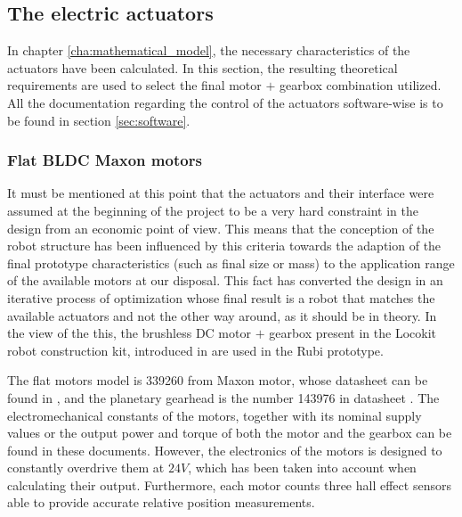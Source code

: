 
\subsection{The electric actuators} %
\label{sub:electric_actuators}
In chapter \ref{cha:mathematical_model}, the necessary characteristics of the actuators have been calculated.
In this section, the resulting theoretical requirements are used to select the final motor $+$ gearbox combination utilized.
All the documentation regarding the control of the actuators software-wise is to be found in section \ref{sec:software}.

\subsubsection{Flat BLDC Maxon motors} %
\label{ssub:the_bldc_motors}
It must be mentioned at this point that the actuators and their interface were assumed at the beginning of the project to be a very hard constraint in the design from an economic point of view. 
This means that the conception of the robot structure has been influenced by this criteria towards the adaption of the final prototype characteristics (such as final size or mass) to the application range of the available motors at our disposal.
This fact has converted the design in an iterative process of optimization whose final result is a robot that matches the available actuators and not the other way around, as it should be in theory.
In the view of the this, the brushless DC motor $+$ gearbox present in the Locokit robot construction kit, introduced in \cite{locokit} are used in the Rubi prototype.

The flat motors model is 339260 from Maxon motor, whose datasheet can be found in \cite{maxon_motor}, and the planetary gearhead is the number 143976 in datasheet \cite{maxon_gear}.
The electromechanical constants of the motors, together with its nominal supply values or the output power and torque of both the motor and the gearbox can be found in these documents. 
However, the electronics of the motors is designed to constantly overdrive them at $24V$, which has been taken into account when calculating their output.
Furthermore, each motor counts three hall effect sensors able to provide accurate relative position measurements.




